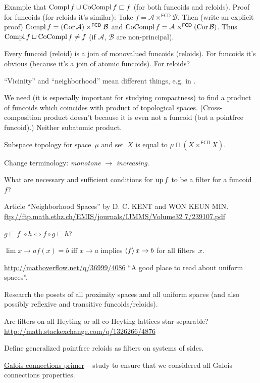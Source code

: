 \documentclass{amsart}
\begin{document}
Example that $\operatorname{Compl} f\sqcup\operatorname{CoCompl} f\sqsubset f$ (for both funcoids and reloids).
Proof for funcoids (for reloids it's similar): Take $f=\mathcal{A}\times^{\mathsf{FCD}}\mathcal{B}$. Then (write an explicit proof)
$\operatorname{Compl} f=(\operatorname{Cor}\mathcal{A})\times^{\mathsf{FCD}}\mathcal{B}$ and $\operatorname{CoCompl} f=\mathcal{A}\times^{\mathsf{FCD}}(\operatorname{Cor}\mathcal{B})$.
Thus $\operatorname{Compl} f\sqcup\operatorname{CoCompl} f\ne f$ (if $\mathcal{A}$, $\mathcal{B}$ are non-principal).

Every funcoid (reloid) is a join of monovalued funcoids (reloids). For funcoids it's obvious
(because it's a join of atomic funcoids). For reloids?

``Vicinity'' and ``neighborhood'' mean different things, e.g. in \cite{converg}.

We need (it is especially important for studying compactness) to find a product of funcoids which coincides with
product of topological spaces. (Cross-composition product doesn't because it is even not a funcoid (but a pointfree funcoid).)
Neither subatomic product.

Subspace topology for space~$\mu$ and set~$X$ is equal to $\mu\sqcap(X\times^{\mathsf{FCD}} X)$.

Change terminology: \emph{monotone} $\rightarrow$ \emph{increasing}.

What are necessary and sufficient conditions for $\operatorname{up} f$ to be a filter for a funcoid~$f$?

Article ``Neighborhood Spaces'' by D. C. KENT and WON KEUN MIN.
\url{ftp://ftp.math.ethz.ch/EMIS/journals/IJMMS/Volume32 7/239107.pdf}

$g\sqsubseteq f^{\circ}\circ h \Leftrightarrow f\circ g\sqsubseteq h$?

$\lim {x\rightarrow a} f(x) = b$ iff $x\rightarrow a$ implies $\left\langle f\right\rangle x\rightarrow b$ for all filters~$x$.

\url{http://mathoverflow.net/q/36999/4086} ``A good place to read about uniform spaces''.

Research the posets of all proximity spaces and all uniform spaces (and also possibly reflexive and transitive funcoids/reloids).

Are filters on all Heyting or all co-Heyting lattices star-separable?
\url{http://math.stackexchange.com/q/1326266/4876}

Define generalized pointfree reloids as filters on systems of sides.

\href{https://www.math.ksu.edu/~strecker/primer.ps}{Galois connections primer} -- study to ensure that we considered all Galois connections properties.
\end{document}
